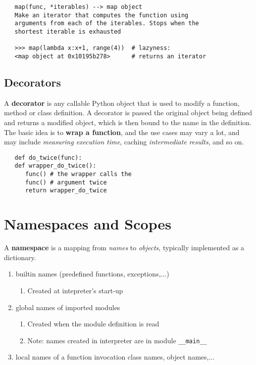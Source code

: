 \begin{lstlisting}
   map(func, *iterables) --> map object
   Make an iterator that computes the function using
   arguments from each of the iterables. Stops when the
   shortest iterable is exhausted

   >>> map(lambda x:x+1, range(4))  # lazyness: 
   <map object at 0x10195b278>      # returns an iterator
\end{lstlisting}

\subsection{Decorators}
A \textbf{decorator} is any callable Python object that is used
to modify a function, method or class definition.
A decorator is passed the original object being defined
and returns a modified object, which is then bound to the name in the definition.
The basic idea is to \textbf{wrap a function},
and the use cases may vary a lot, 
and may include \textit{measuring execution time}, caching \textit{intermediate results}, and so on.

\begin{lstlisting}
   def do_twice(func):
   def wrapper_do_twice():
      func() # the wrapper calls the
      func() # argument twice
      return wrapper_do_twice
\end{lstlisting}

\section{Namespaces and Scopes}
A \textbf{namespace} is a mapping from \textit{names} to \textit{objects}, typically
implemented as a dictionary.
\begin{enumerate}
   \item builtin names (predefined functions, exceptions,...)
   \begin{enumerate}
      \item Created at intepreter's start-up
   \end{enumerate}
   \item global names of imported modules
   \begin{enumerate}
      \item Created when the module definition is read
      \item Note: names created in interpreter are in module \lstinline|__main__|
   \end{enumerate}
   \item local names of a function invocation
   class names, object names,...
\end{enumerate}
\nl

